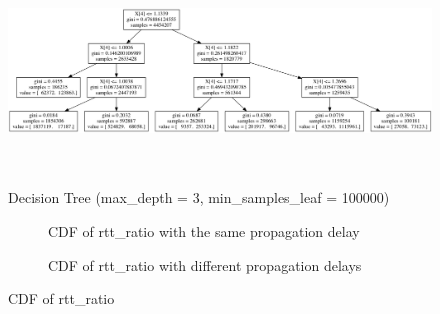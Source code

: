 \begin{figure}
\centering
  \includegraphics[width=\textwidth,height=6cm]{tree.png}
  \caption{Decision Tree (max\_depth = 3, min\_samples\_leaf = 100000)}
  \label{DT}
\end{figure}

\begin{figure}[!htb]\centering
   \begin{subfigure}{0.49\textwidth}
\caption{CDF of rtt\_ratio with the same propagation delay}
\label{CDFrtt}

   \end{subfigure}
   \begin {subfigure}{0.49\textwidth}
\caption{CDF of rtt\_ratio with different propagation delays}
\label{CDFrttDiff}
   \end{subfigure}
\caption{CDF of rtt\_ratio}
\label{fig:cdf1}
\end{figure}



